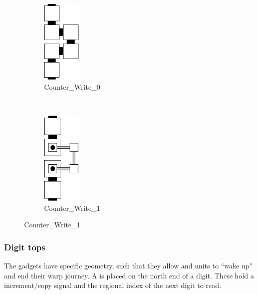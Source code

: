         \vspace{.5cm}

        \begin{figure}[H]
            \centering
            \begin{subfigure}[t]{0.2\textwidth}
                \centering
                \includegraphics[width=0.2\textwidth]{write/write_0}
                \caption{\label{fig:write/write_1} Counter\_Write\_0}
            \end{subfigure}%
            ~
            \begin{subfigure}[t]{0.2\textwidth}
                \centering
                \includegraphics[width=0.2\textwidth]{write/write_1}
                \caption{\label{fig:write/write_1} Counter\_Write\_1}
            \end{subfigure}%
        \end{figure}

    \subsubsection{Digit tops}
        The {\dtop} gadgets have specific geometry, such that they allow {\firstwarp} and
        {\secondwarp} units to ``wake up" and end their warp journey. A {\dtop} is placed on
        the north end of a digit. These hold a increment/copy signal and the regional index
        of the next digit to read.
        \vspace{1cm}

